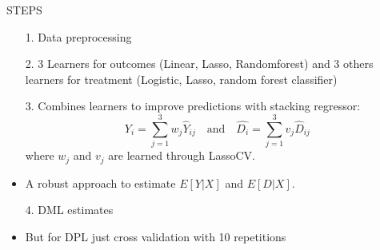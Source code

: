 \documentclass[aspectratio=169]{beamer}
\begin{document}
\begin{frame}{STEPS}

\begin{itemize}
    \item[1.] Data preprocessing

    \item[2.] 3 Learners for outcomes (Linear, Lasso, Randomforest) and 3 others learners for treatment (Logistic, Lasso, random forest classifier)
    \item[3.] Combines learners to improve predictions with stacking regressor: \[         \hat{Y_i} = \sum_{j=1}^{3} w_j \hat{Y}_{ij}      \text{  }  \text{ and } \text{  }  \hat{D_i} = \sum_{j=1}^{3} v_j \hat{D}_{ij}         \] 
    where \( w_j \)  and \( v_j \) are learned through LassoCV.
        \item A robust approach to estimate \( E[Y|X] \) and \( E[D|X] \).
    \item[4.] DML estimates 
    \item But for DPL just cross validation with 10 repetitions
\end{itemize}
    
\end{frame}
\end{document}
